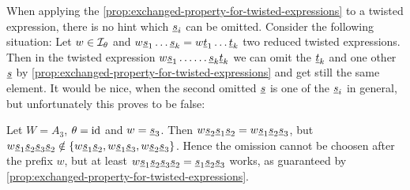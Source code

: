 When applying the \ref{prop:exchanged-property-for-twisted-expressions} to a twisted expression, there is no hint which $\underline{s}_i$ can be omitted. Consider the following situation: Let $w \in \mathcal{I}_{\theta}$ and $w \underline{s}_1 \ldots \underline{s}_k = w \underline{t}_1 \ldots \underline{t}_k$ two reduced twisted expressions. Then in the twisted expression $w \underline{s}_1 \ldots \ldots \underline{s}_k \underline{t}_k$ we can omit the $\underline{t}_k$ and one other $\underline{s}$ by \ref{prop:exchanged-property-for-twisted-expressions} and get still the same element. It would be nice, when the second omitted $\underline{s}$ is one of the $\underline{s}_i$ in general, but unfortunately this proves to be false:

\begin{exam}
	Let $W = A_3$, $\theta = \operatorname{id}$ and $w = \underline{s}_3$. Then $w \underline{s}_2 \underline{s}_1 \underline{s}_2 = w \underline{s}_1 \underline{s}_2 \underline{s}_3$, but $w \underline{s}_1 \underline{s}_2 \underline{s}_3 \underline{s}_2 \notin \{ w \underline{s}_1 \underline{s}_2, w \underline{s}_1 \underline{s}_3, w \underline{s}_2 \underline{s}_3 \}$. Hence the omission cannot be choosen after the prefix $w$, but at least $w \underline{s}_1 \underline{s}_2 \underline{s}_3 \underline{s}_2 = \underline{s}_1 \underline{s}_2 \underline{s}_3$ works, as guaranteed by \ref{prop:exchanged-property-for-twisted-expressions}.
\end{exam}
